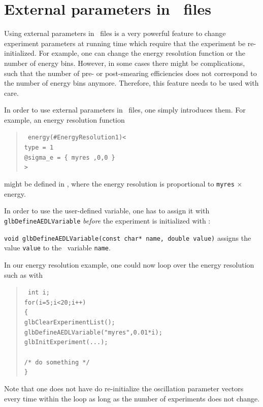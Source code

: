 \section{External parameters in \AEDL\ files}
\label{sec:aedlparams}

Using external parameters in \AEDL\ files is a very powerful feature
to change experiment parameters at running time which require that
the experiment be re-initialized. For example, one can change the
energy resolution function or the number of energy bins. However,
in some cases there might be complications, such that the number
of pre- or post-smearing efficiencies does not correspond to the number
of energy bins anymore. Therefore, this feature needs to be 
used with care.

In order to use external parameters in \AEDL\ files, one simply
introduces them. For example, an energy resolution function
\begin{quote}
{\tt
energy(\#EnergyResolution1)< \\
\hspace*{1cm} type = 1 \\
\hspace*{1cm} @sigma\_e = \{ myres ,0,0 \} \\
> \\
}
\end{quote}
might be defined in \AEDL , where the energy resolution is proportional
to {\tt myres} $\times$ energy. 

In order to use the user-defined variable, one has to assign it 
with {\tt glbDefineAEDLVariable} {\em before} the experiment is initialized with :
\begin{function}
{\tt void glbDefineAEDLVariable(const char* name, double value)}
assigns the value {\tt value} to the \AEDL\ variable {\tt name}.
\end{function}
In our energy resolution example, one could now loop over the
energy resolution such as with
\begin{quote}
{\tt
int i; \\
for(i=5;i<20;i++) \\
\{ \\    
\hspace*{1cm} glbClearExperimentList(); \\
\hspace*{1cm} glbDefineAEDLVariable("myres",0.01*i); \\
\hspace*{1cm} glbInitExperiment(...); \\
\\
\hspace*{1cm} /* do something */ \\
\}
}
\end{quote}
Note that one does not have do re-initialize the oscillation
parameter vectors every time within the loop as long as the
number of experiments does not change.

